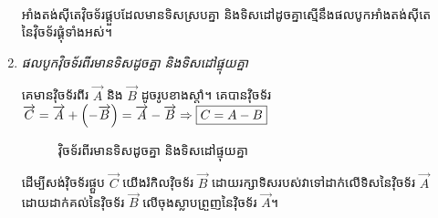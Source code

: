 \begin{enumerate}[m]
\begin{align*}
	\end{align*}
	\begin{generality}
		អាំងតង់សុីតេវុិចទ័រផ្គួបដែលមានទិសស្របគ្នា និងទិសដៅដូចគ្នាស្មើនឹងផលបូកអាំងតង់សុីតេនៃវុិចទ័រផ្គុំទាំងអស់។
	\end{generality}
	\item \emph{\kml ផលបូកវុិចទ័រពីរមានទិសដូចគ្នា និងទិសដៅផ្ទុយគ្នា}
	\begin{multicols}{2}
		គេមានវុិចទ័រពីរ $\overrightarrow{A}$ និង $\overrightarrow{B}$ ដូចរូបខាងស្តាំ។ គេបានវុិចទ័រ $\overrightarrow{C}=\overrightarrow{A}+\left(-\overrightarrow{B}\right)=\overrightarrow{A}-\overrightarrow{B}\Rightarrow\fbox{$C=A-B$}$\\
		\begin{figure}[H]
			\centering
			\caption{\koc វុិចទ័រពីរមានទិសដូចគ្នា និងទិសដៅផ្ទុយគ្នា}
		\end{figure}
	\end{multicols}
	\begin{multicols}{2}
		ដើម្បីសង់វុិចទ័រផ្គួប $\overrightarrow{C}$ យើងរំកិលវុិចទ័រ $\overrightarrow{B}$ ដោយរក្សាទិសរបស់វាទៅដាក់លើទិសនៃវុិចទ័រ $\overrightarrow{A}$ ដោយដាក់គល់នៃវុិចទ័រ $\overrightarrow{B}$ លើចុងស្លាបព្រួញនៃវុិចទ័រ $\overrightarrow{A}$។
		\begin{figure}[H]
			\centering

\end{figure}
\end{multicols}
\end{enumerate}
